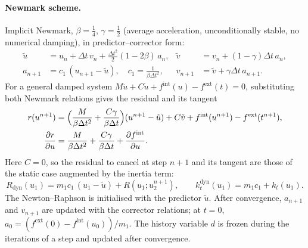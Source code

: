 \documentclass[11pt,a4paper]{article}
\begin{document}
\paragraph{Newmark scheme.}
Implicit Newmark, $\beta=\tfrac14$, $\gamma=\tfrac12$ (average acceleration, unconditionally
stable, no numerical damping), in predictor--corrector form:
\begin{align}
  \tilde u &= u_n + \Delta t\,v_n + \tfrac{\Delta t^2}{2}(1-2\beta)\,a_n, &
  \tilde v &= v_n + (1-\gamma)\Delta t\,a_n,\\
  a_{n+1} &= c_1\,(u_{n+1}-\tilde u),\quad c_1 = \frac{1}{\beta\Delta t^2}, &
  v_{n+1} &= \tilde v + \gamma\Delta t\,a_{n+1}.
\end{align}
For a general damped system $M\ddot u + C\dot u + f^{\text{int}}(u) - f^{\text{ext}}(t) = 0$,
substituting both Newmark relations gives the residual and its tangent
\begin{align}
  r(u^{n+1}) &= \Bigl(\frac{M}{\beta\Delta t^2} + \frac{C\gamma}{\beta\Delta t}\Bigr)(u^{n+1}-\tilde u)
  + C\tilde v + f^{\text{int}}(u^{n+1}) - f^{\text{ext}}(t^{n+1}),\\
  \frac{\partial r}{\partial u} &= \frac{M}{\beta\Delta t^2} + \frac{C\gamma}{\beta\Delta t}
  + \frac{\partial f^{\text{int}}}{\partial u}.
\end{align}
Here $C = 0$, so the residual to cancel at step $n+1$ and its tangent are those of the static
case augmented by the inertia term:
\begin{equation}
  R_{\text{dyn}}(u_1) = m_1c_1\,(u_1-\tilde u) + R(u_1;u_2^{n+1}),\qquad
  k_t^{\text{dyn}}(u_1) = m_1c_1 + k_t(u_1).
  \label{eq:resdyn}
\end{equation}
The Newton--Raphson is initialised with the predictor $\tilde u$. After convergence,
$a_{n+1}$ and $v_{n+1}$ are updated with the corrector relations; at $t=0$,
$a_0 = (f^{\text{ext}}(0) - f^{\text{int}}(u_0))/m_1$. The history variable
$d$ is frozen during the iterations of a step and updated after convergence.
\end{document}
